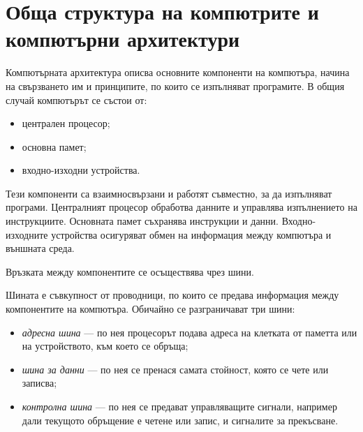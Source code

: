 \begin{konspekt}
\end{konspekt}

\section{Обща структура на компютрите и компютърни архитектури}\label{s:9.1}

Компютърната архитектура описва основните компоненти на компютъра, начина на свързването им и принципите, по които се изпълняват програмите. В общия случай компютърът се състои от:

\begin{itemize}
    \item централен процесор;
    \item основна памет;
    \item входно-изходни устройства.
\end{itemize}

Тези компоненти са взаимносвързани и работят съвместно, за да изпълняват програми. Централният процесор обработва данните и управлява изпълнението на инструкциите. Основната памет съхранява инструкции и данни. Входно-изходните устройства осигуряват обмен на информация между компютъра и външната среда.

Връзката между компонентите се осъществява чрез шини.

\begin{defn}[Шина]
Шината е съвкупност от проводници, по които се предава информация между компонентите на компютъра. Обичайно се разграничават три шини:

\begin{itemize}
\item \emph{адресна шина} --- по нея процесорът подава адреса на клетката от паметта или на устройството, към което се обръща;
\item \emph{шина за данни} --- по нея се пренася самата стойност, която се чете или записва;
\item \emph{контролна шина} --- по нея се предават управляващите сигнали, например дали текущото обръщение е четене или запис, и сигналите за прекъсване.
\end{itemize}
\end{defn}

